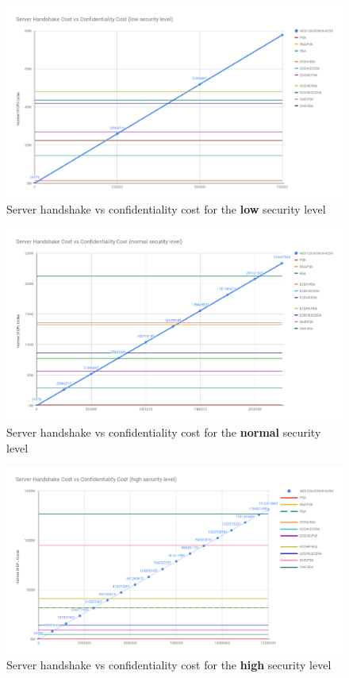 \begin{figure}
  \centering
  \includegraphics[width=1.0\textwidth]{img/srv_conf_hs_low.png}
  \centering \caption{\label{fig:srv-conf-hs-low} Server handshake vs confidentiality cost for the \textbf{low} security level}
\end{figure}

\begin{figure}
  \centering
  \includegraphics[width=1.0\textwidth]{img/srv_conf_hs_normal.png}
  \centering \caption{\label{fig:srv-conf-hs-normal} Server handshake vs confidentiality cost for the \textbf{normal} security level}
\end{figure}

\begin{figure}
  \centering
  \includegraphics[width=1.0\textwidth]{img/srv_conf_hs_high.png}
  \centering \caption{\label{fig:srv-conf-hs-high} Server handshake vs confidentiality cost for the \textbf{high} security level}
\end{figure}


